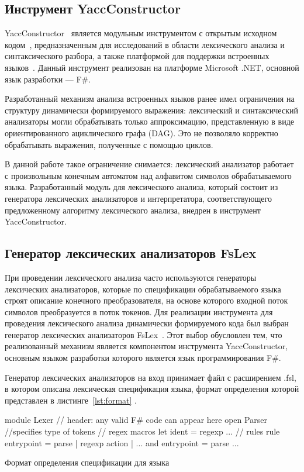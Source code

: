 \documentclass[10pt, conference, compsocconf]{IEEEtran}
\begin{document}
\subsection{Инструмент YaccConstructor}

YaccConstructor~\cite{YC_article} является модульным инструментом с открытым исходном кодом~\cite{YCrepo}, предназначенным для исследований в области лексического анализа и синтаксического разбора, а  также платформой для поддержки встроенных языков~\cite{YC_SECR}. Данный инструмент реализован на платформе Microsoft .NET, основной язык разработки --- F\#.  

Разработанный механизм анализа встроенных языков ранее имел ограничения на структуру динамически формируемого выражения: лексический и синтаксический анализаторы могли обрабатывать только аппроксимацию, представленную в виде ориентированного ациклического графа (DAG). Это не позволяло корректно обрабатывать выражения, полученные с помощью циклов.
	
В данной работе такое ограничение снимается: лексический анализатор работает с произвольным конечным автоматом над алфавитом символов обрабатываемого языка. Разработанный модуль для лексического анализа, который состоит из генератора лексических анализаторов и интерпретатора, соответствующего предложенному алгоритму лексического анализа, внедрен в инструмент YaccConstructor.    

\subsection{Генератор лексических анализаторов FsLex}

При проведении лексического анализа часто используются генераторы лексических анализаторов, которые по спецификации обрабатываемого языка строят описание конечного преобразователя, на основе которого входной поток символов преобразуется в поток токенов. Для реализации инструмента для проведения лексического анализа динамически формируемого кода был выбран генератор лексических анализаторов FsLex~\cite{FsLex}. Этот выбор обусловлен тем, что реализованный механизм является компонентом инструмента YaccConstructor, основным языком разработки которого является язык программирования F\#. 

Генератор лексических анализаторов на вход принимает файл с расширением .fsl, в котором описана лексическая спецификация  языка, формат определения которой представлен в листинге~\ref{lst:format} .


\begin{listing}[H]
\begin{pyglist}[language=csharp,numbers=none,numbersep=5pt]
{
module Lexer
// header: any valid F# code can appear here
open Parser //specifies type of tokens 
}
// regex macros 
let ident = regexp ... 
// rules   
rule entrypoint = parse
| regexp { action }
| ... 
and entrypoint = parse
...
\end{pyglist}
\caption{Формат определения спецификации для языка}
\label{lst:format}
\end{listing}
\end{document}
